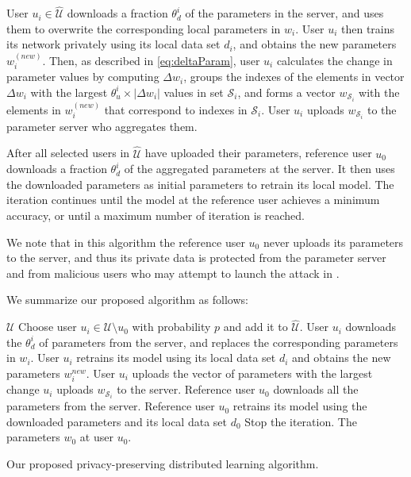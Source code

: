 \documentclass[conference]{IEEEtran}
\begin{document}
User $u_i\in\hat{\mathcal{U}}$ downloads a fraction $\theta_d^i$ of the parameters
in the server, and uses them to overwrite the  corresponding local parameters in $w_i$.
User $u_i$ then trains its network privately using its local data set  $d_i$, and obtains the new parameters $w_i^{(new)}$.
Then, as described in \eqref{eq:deltaParam}, user $u_i$ calculates the change in parameter values by computing $\Delta w_i$, groups the
indexes of the elements in vector $\Delta w_i$ with the largest $\theta_u^i\times |\Delta w_i|$ values in set $\mathcal{S}_i$, and 
forms a vector $w_{\mathcal{S}_i}$ with the elements in $w_i^{(new)}$ that correspond to indexes in $\mathcal{S}_i$. 
User $u_i$ uploads $w_{\mathcal{S}_i}$ to the parameter server who aggregates them. 


After all selected users in $\hat{\mathcal{U}}$ have uploaded their parameters, reference user $u_0$ downloads a fraction $\theta_d^i$
of the aggregated parameters at the server. It then uses the downloaded parameters as initial parameters to retrain its local model.
The iteration
continues until the model at the reference user achieves a minimum accuracy, or until a maximum number of iteration is reached. 

We note that in this algorithm  the reference user  $u_0$ never uploads its parameters to the server, and thus its  private data is
protected from the parameter server and from  malicious users who may attempt to launch the attack in \cite{hitaj2017deep}. 


We summarize our proposed algorithm as follows:

\begin{algorithm}
\begin{algorithmic}[1]
\REQUIRE $\mathcal{U}$
\STATE Choose user $u_i\in\mathcal{U}\setminus u_0$ with probability $p$  and add it to $\hat{\mathcal{{U}}}$.
\STATE User $u_i$ downloads the $\theta_d^i$ of parameters from the server, and replaces the corresponding parameters in $w_i$. 
\STATE User $u_i$ retrains its model using its local data set $d_i$ and obtains the new parameters $w_i^{new}$. 
\STATE User $u_i$ uploads the vector of parameters with the largest change $u_i$ uploads $w_{\mathcal{S}_i}$ to the server.
\ENDFOR
\STATE Reference user $u_0$ downloads all the parameters from the server. 
\STATE Reference user $u_0$ retrains its model using the downloaded parameters and its local data set $d_0$
\STATE Stop the iteration. 
\ENDIF
\ENDFOR
\ENSURE The parameters $w_0$ at user $u_0$.
\end{algorithmic}
\caption{Our proposed privacy-preserving distributed learning algorithm.}
\end{algorithm}
\end{document}

